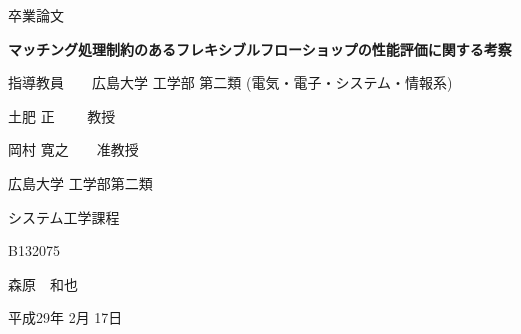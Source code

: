 \begin{center}

\vspace{50mm}
{\Large {卒業論文}}

\vspace{20mm}
{\LARGE {\bf マッチング処理制約のあるフレキシブルフローショップの性能評価に関する考察\\\vspace{2mm}
}}

\end{center}

\vspace{70mm}

\begin{flushright}

指導教員　　広島大学 工学部 第二類 (電気・電子・システム・情報系)

\vspace{2mm}

土肥 正　  　教授

\vspace{2mm}

岡村 寛之　　准教授

\vspace{15mm}

広島大学 工学部第二類

\vspace{2mm}

システム工学課程

\vspace{5mm}

B132075

\vspace{5mm}

森原　和也

\vspace{15mm}

平成29年 2月 17日

\end{flushright}
